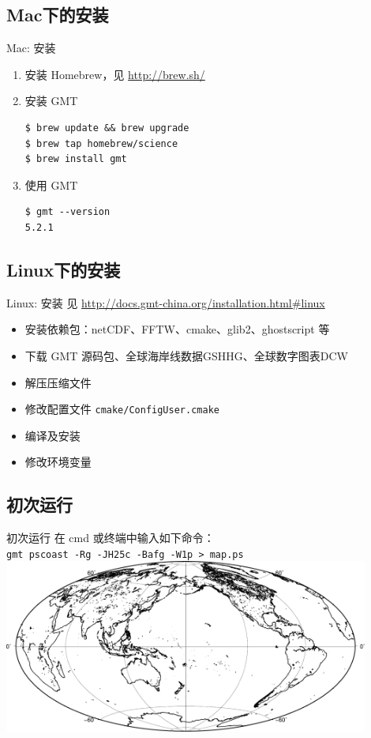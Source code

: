 \documentclass[UTF8, 11pt]{ctexbeamer}
\begin{document}
\subsection{Mac下的安装}
\begin{frame}[fragile]{Mac: 安装}
\begin{enumerate}
\item 安装 Homebrew，见 \url{http://brew.sh/}
\item 安装 GMT
\begin{verbatim}
$ brew update && brew upgrade
$ brew tap homebrew/science
$ brew install gmt
\end{verbatim}
\item 使用 GMT
\begin{verbatim}
$ gmt --version
5.2.1
\end{verbatim}
\end{enumerate}
\end{frame}

\subsection{Linux下的安装}
\begin{frame}[fragile]{Linux: 安装}
见 \small{\url{http://docs.gmt-china.org/installation.html#linux}}
\begin{itemize}
\item 安装依赖包：netCDF、FFTW、cmake、glib2、ghostscript 等
\item 下载 GMT 源码包、全球海岸线数据GSHHG、全球数字图表DCW
\item 解压压缩文件
\item 修改配置文件 \verb|cmake/ConfigUser.cmake|
\item 编译及安装
\item 修改环境变量
\end{itemize}
\end{frame}

\subsection{初次运行}
\begin{frame}[fragile]{初次运行}
在 cmd 或终端中输入如下命令：\\
\verb|gmt pscoast -Rg -JH25c -Bafg -W1p > map.ps| \\[1cm]
\includegraphics[width=0.9\textwidth]{first_run}
\end{frame}
\end{document}
